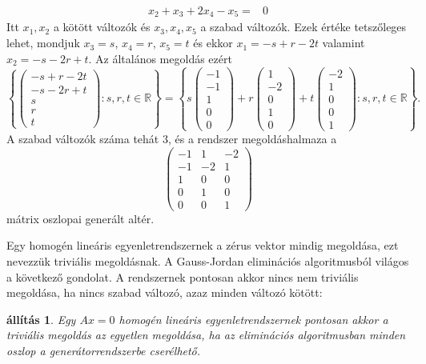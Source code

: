 \documentclass[9pt, showtrims]{memoir}
\theoremstyle{plain}
\newtheorem{proposition}{állítás}[section]
\theoremstyle{remark}
\theoremstyle{definition}
\renewcommand{\mathbf}{\mathbb}
\begin{document}
\begin{enumerate}
\[\begin{array}{rl}
                x_2+x_3+2x_4-x_5=&0
            \end{array}
        \]
        Itt $x_1,x_2$ a kötött változók és $x_3,x_4,x_5$ a szabad változók.
        Ezek értéke tetszőleges lehet, mondjuk $x_3=s$, $x_4=r$, $x_5=t$ és ekkor 
        $x_1=-s+r-2t$ valamint $x_2=-s-2r+t$.
        Az általános megoldás ezért
        \[
            \left\{ 
                \begin{pmatrix}
                    -s+r-2t\\
                    -s-2r+t\\
                    s\\
                    r\\
                    t
                \end{pmatrix}
                :s,r,t\in\mathbf{R}
            \right\}
            =
            \left\{ s
                \begin{pmatrix}
                    -1\\-1\\1\\0\\0
                \end{pmatrix}
                +
                r
                \begin{pmatrix}
                    1\\-2\\0\\1\\0
                \end{pmatrix}
                +
                t
                \begin{pmatrix}
                    -2\\1\\0\\0\\1
                \end{pmatrix}
                :s,r,t\in\mathbf{R}
            \right\}.
        \]
        A szabad változók száma tehát $3$, 
        és a rendszer megoldáshalmaza a 
        \[
            \begin{pmatrix}
                -1&1&-2\\
                -1&-2&1\\
                1&0&0\\
                0&1&0\\
                0&0&1
            \end{pmatrix}
        \]
        mátrix oszlopai generált altér.
\end{enumerate}
Egy homogén lineáris egyenletrendszernek a zérus vektor mindig megoldása,
ezt nevezzük triviális megoldásnak.
A Gauss-Jordan eliminációs algoritmusból világos a következő gondolat.
A rendszernek pontosan akkor nincs nem triviális megoldása, 
ha nincs szabad változó, azaz minden változó kötött:
\begin{proposition}
    Egy $Ax=0$ homogén lineáris egyenletrendszernek pontosan akkor a triviális megoldás az egyetlen megoldása, 
    ha az eliminációs algoritmusban minden oszlop a generátorrendszerbe cserélhető.
\end{proposition}
\end{document}
